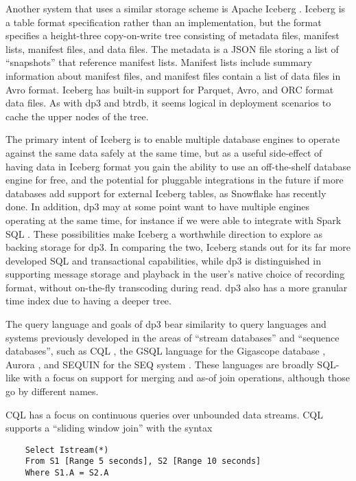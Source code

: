 \documentclass[9pt,twocolumn]{article}
\newcommand{\q}[1]{``#1''}
\begin{document}
    Another system that uses a similar storage scheme is Apache Iceberg
    \cite{iceberg}. Iceberg is a table format specification rather than an
    implementation, but the format specifies a height-three copy-on-write tree
    consisting of metadata files, manifest lists, manifest files, and data
    files. The metadata is a JSON file storing a list of \q{snapshots} that
    reference manifest lists. Manifest lists include summary information about
    manifest files, and manifest files contain a list of data files in Avro
    format. Iceberg has built-in support for Parquet, Avro, and ORC format
    data files. As with dp3 and btrdb, it seems logical in deployment scenarios
    to cache the upper nodes of the tree.

    The primary intent of Iceberg is to enable multiple database engines to
    operate against the same data safely at the same time, but as a useful
    side-effect of having data in Iceberg format you gain the ability to use an
    off-the-shelf database engine for free, and the potential for pluggable
    integrations in the future if more databases add support for external Iceberg
    tables, as Snowflake has recently done. In addition, dp3 may at some point
    want to have multiple engines operating at the same time, for instance if we
    were able to integrate with Spark SQL \cite{spark}. These possibilities make Iceberg a
    worthwhile direction to explore as backing storage for dp3. In comparing the
    two, Iceberg stands out for its far more developed SQL and transactional
    capabilities, while dp3 is distinguished in supporting message storage and
    playback in the user's native choice of recording format, without on-the-fly
    transcoding during read. dp3 also has a more granular time index due to
    having a deeper tree.

    The query language and goals of dp3 bear similarity to query languages and
    systems previously developed in the areas of \q{stream databases} and
    \q{sequence databases}, such as CQL \cite{cql}, the GSQL language for the
    Gigascope database \cite{gigascope}, Aurora \cite{aurora}, and SEQUIN for
    the SEQ system \cite{seq}. These languages are broadly SQL-like with a focus on
    support for merging and as-of join operations, although those go by
    different names.

    CQL has a focus on continuous queries over unbounded data streams. CQL
    supports a \q{sliding window join} with the syntax 

    \begin{lstlisting}
    Select Istream(*)
    From S1 [Range 5 seconds], S2 [Range 10 seconds]
    Where S1.A = S2.A
    \end{lstlisting}
\end{document}
